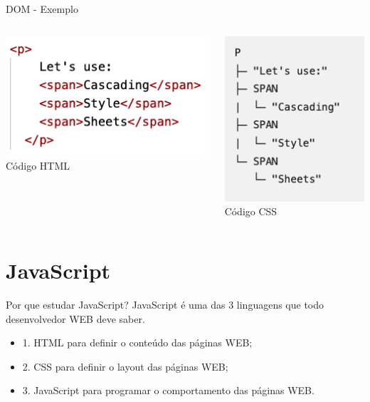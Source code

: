 \documentclass{beamer}
\begin{document}
\begin{frame}{DOM - Exemplo}
\begin{columns}
\begin{column}{0.5\textwidth}
        \begin{center}
		  \includegraphics[height=0.4\paperheight]{fig/aula2/dom3.png} \\
		  \tiny{Código HTML}
	  \end{center}
   \end{column}
   \begin{column}{0.5\textwidth}
        \begin{center}
		  \includegraphics[height=0.4\paperheight]{fig/aula2/dom2.png} \\
		  \tiny{Código CSS}
	  \end{center}
	  
   \end{column}
\end{columns}

\end{frame}
\section{JavaScript}
\begin{frame}{Por que estudar JavaScript?}
JavaScript é uma das 3 linguagens que todo desenvolvedor WEB deve saber.
	\begin{block}{}
	 \begin{itemize}
	  \item 1. HTML para definir o conteúdo das páginas WEB;
	  \item 2. CSS para definir o layout das páginas WEB;
	  \item 3. JavaScript para programar o comportamento das páginas WEB.
	 \end{itemize}
	\end{block}

\end{frame}
\end{document}

